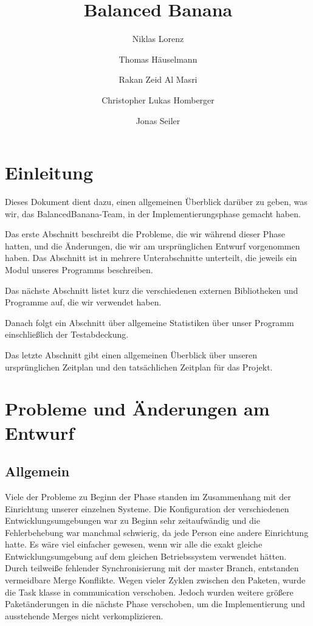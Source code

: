 \documentclass[a4paper,12pt]{article}
\title{Balanced Banana}
\author{Niklas Lorenz \and Thomas Häuselmann \and Rakan Zeid Al Masri \and Christopher Lukas Homberger \and Jonas Seiler}
\begin{document}
\setcounter{page}{2}
\tableofcontents          %
\clearpage
{}

\section{Einleitung}
\vspace{0.2cm}
Dieses Dokument dient dazu, einen allgemeinen Überblick darüber zu geben, was wir, das BalancedBanana-Team, in der Implementierungsphase gemacht haben. \par
\vspace{5mm}

Das erste Abschnitt beschreibt die Probleme, die wir während dieser Phase hatten, und die Änderungen, die wir am ursprünglichen Entwurf vorgenommen haben. Das Abschnitt ist in mehrere Unterabschnitte unterteilt, die jeweils ein Modul unseres Programms beschreiben.\par 
\vspace{5mm}

Das nächste Abschnitt listet kurz die verschiedenen externen Bibliotheken und Programme auf, die wir verwendet haben.\par 
\vspace{5mm}

Danach folgt ein Abschnitt über allgemeine Statistiken über unser Programm einschließlich der Testabdeckung.\par
\vspace{5mm}

Das letzte Abschnitt gibt einen allgemeinen Überblick über unseren ursprünglichen Zeitplan und den tatsächlichen Zeitplan für das Projekt.

\clearpage
\section{Probleme und Änderungen am Entwurf}
\subsection{Allgemein}
\vspace{0.2cm}
Viele der Probleme zu Beginn der Phase standen im Zusammenhang mit der Einrichtung unserer einzelnen Systeme. Die Konfiguration der verschiedenen Entwicklungsumgebungen war zu Beginn sehr zeitaufwändig und die Fehlerbehebung war manchmal schwierig, da jede Person eine andere Einrichtung hatte. Es wäre viel einfacher gewesen, wenn wir alle die exakt gleiche Entwicklungsumgebung auf dem gleichen Betriebssystem verwendet hätten.
Durch teilweiße fehlender Synchronisierung mit der master Branch, entstanden vermeidbare Merge Konflikte.
Wegen vieler Zyklen zwischen den Paketen, wurde die Task klasse in communication verschoben.
Jedoch wurden weitere größere Paketänderungen in die nächste Phase verschoben, um die Implementierung und ausstehende Merges nicht verkomplizieren.
\clearpage
\end{document}
